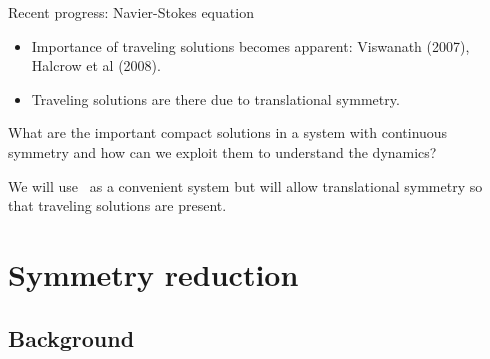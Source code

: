 \documentclass{beamer}
\begin{document}
\begin{frame}{Recent progress: Navier-Stokes equation}

\begin{itemize}
 \item Importance of traveling solutions becomes apparent:
	Viswanath (2007), Halcrow et al (2008).
 \item Traveling solutions are there due to translational
	symmetry.
\end{itemize}

\begin{block}{}
What are the important compact solutions in a system with
continuous symmetry and how can we exploit them to understand
the dynamics?
\end{block}

We will use \KSe\ as a convenient system but will allow translational
symmetry so that traveling solutions are present.

\end{frame}

\section{Symmetry reduction}

\subsection{Background}
\end{document}
